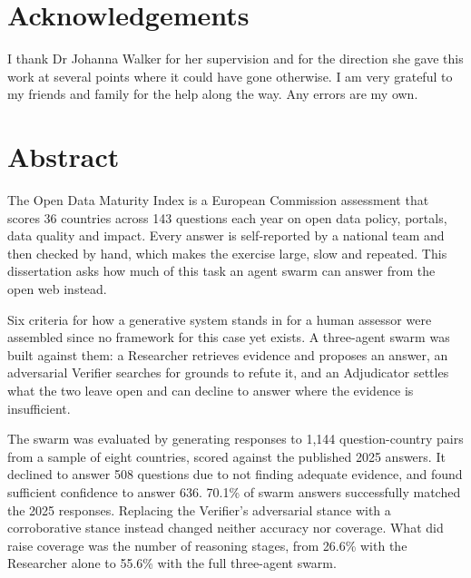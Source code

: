 
\chapter*{Acknowledgements}

I thank Dr Johanna Walker for her supervision and for the direction she gave this work at several points where it could have gone otherwise. I am very grateful to my friends and family for the help along the way. Any errors are my own.

\chapter*{Abstract}

The Open Data Maturity Index is a European Commission assessment that scores 36 countries across 143 questions each year on open data policy, portals, data quality and impact. Every answer is self-reported by a national team and then checked by hand, which makes the exercise large, slow and repeated. This dissertation asks how much of this task an agent swarm can answer from the open web instead.

Six criteria for how a generative system stands in for a human assessor were assembled since no framework for this case yet exists. A three-agent swarm was built against them: a Researcher retrieves evidence and proposes an answer, an adversarial Verifier searches for grounds to refute it, and an Adjudicator settles what the two leave open and can decline to answer where the evidence is insufficient.

The swarm was evaluated by generating responses to 1,144 question-country pairs from a sample of eight countries, scored against the published 2025 answers. It declined to answer 508 questions due to not finding adequate evidence, and found sufficient confidence to answer 636. 70.1\% of swarm answers successfully matched the 2025 responses. Replacing the Verifier's adversarial stance with a corroborative stance instead changed neither accuracy nor coverage. What did raise coverage was the number of reasoning stages, from 26.6\% with the Researcher alone to 55.6\% with the full three-agent swarm.

